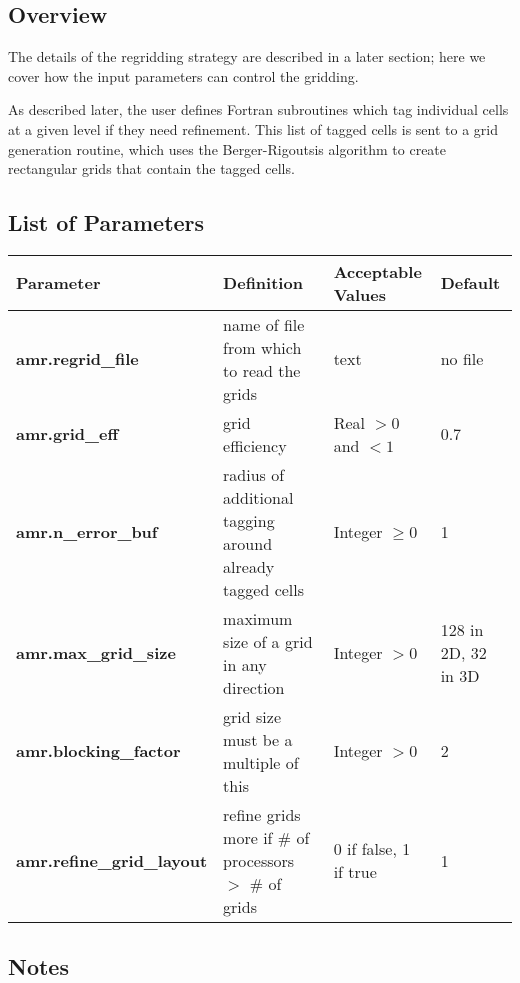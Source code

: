 \subsection{Overview}

The details of the regridding strategy are described in a later section; here we 
cover how the input parameters can control the gridding.

As described later, the user defines Fortran subroutines which tag individual
cells at a given level if they need refinement.  This list of tagged cells is
sent to a grid generation routine, which uses the Berger-Rigoutsis algorithm
to create rectangular grids that contain the tagged cells.   

\subsection{List of Parameters}

\begin{table*}[h]
\begin{scriptsize}
\begin{center}
\begin{tabular}{|l|l|l|l|} \hline
Parameter & Definition & Acceptable Values &Default\\
\hline
{\bf amr.regrid\_file} & name of file from which to read the grids & text & no file  \\ 
{\bf amr.grid\_eff} & grid efficiency & Real $>0$ and $<1$ & 0.7 \\ 
{\bf amr.n\_error\_buf} & radius of additional tagging around already tagged cells & Integer $\geq 0$ & 1 \\ 
{\bf amr.max\_grid\_size} & maximum size of a grid in any direction & Integer $> 0$ & 128 in 2D, 32 in 3D \\ 
{\bf amr.blocking\_factor} &  grid size must be a multiple of this & Integer $> 0$ & 2\\
{\bf amr.refine\_grid\_layout} & refine grids more if \# of processors $>$ \# of grids &  0 if false, 1 if true & 1 \\
\hline
\end{tabular}
\label{Table:GriddingInputs}
\end{center}
\end{scriptsize}
\end{table*}

\subsection{Notes}

